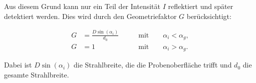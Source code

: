 Aus diesem Grund kann nur ein Teil der Intensität $I$ reflektiert und später detektiert werden. Dies wird durch den 
Geometriefaktor $G$ berücksichtigt:

\begin{align}
    \label{eqn:geome}
    G &= \frac{D\sin{\left(\alpha_i\right)}}{d_0} \qquad &\text{mit} \qquad \alpha_i < \alpha_g,\\
    G &= 1 \qquad &\text{mit} \qquad \alpha_i > \alpha_g.
\end{align}

Dabei ist $D\sin{\left(\alpha_i\right)}$ die Strahlbreite, die die Probenoberfläche trifft und $d_0$ die gesamte
Strahlbreite.  